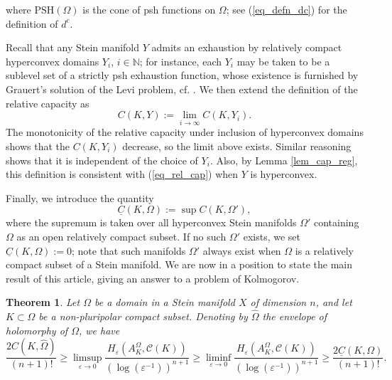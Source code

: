 \documentclass[12pt]{article}
\numberwithin{equation}{section}
\theoremstyle{theorem}
\newtheorem{thm}{Theorem}[section]
\theoremstyle{definition}
\theoremstyle{remark}
\newcommand{\nat}{\mathbb{N}}
\begin{document}
	where $\mathrm{PSH}(\Omega)$ is the cone of psh functions on $\Omega$; see (\ref{eq_defn_dc}) for the definition of $d^c$.
	\par 
	Recall that any Stein manifold $Y$ admits an exhaustion by relatively compact hyperconvex domains $Y_i$, $i \in \nat$; for instance, each $Y_i$ may be taken to be a sublevel set of a strictly psh exhaustion function, whose existence is furnished by Grauert's solution of the Levi problem, cf. \cite[Theorem 5.2.10]{Hormander}.
	We then extend the definition of the relative capacity as
	\begin{equation}\label{eq_rel_cap_gen_dd}
		C(K, Y)
		:=
		\lim_{i \to \infty} C(K, Y_i).
	\end{equation}
	The monotonicity of the relative capacity under inclusion of hyperconvex domains shows that the $C(K, Y_i)$ decrease, so the limit above exists.
	Similar reasoning shows that it is independent of the choice of $Y_i$. 
	Also, by Lemma \ref{lem_cap_reg}, this definition is consistent with (\ref{eq_rel_cap}) when $Y$ is hyperconvex.
	\par 
	Finally, we introduce the quantity
	\begin{equation}\label{eq_und_c}
		\underline{C}(K, \Omega)
		:=
		\sup C(K, \Omega'),
	\end{equation}
	where the supremum is taken over all hyperconvex Stein manifolds $\Omega'$ containing $\Omega$ as an open relatively compact subset.
	If no such $\Omega'$ exists, we set $\underline{C}(K, \Omega) := 0$; note that such manifolds $\Omega'$ always exist when $\Omega$ is a relatively compact subset of a Stein manifold.
	We are now in a position to state the main result of this article, giving an answer to a problem of Kolmogorov.
	\begin{thm}\label{thm_entr}
		Let $\Omega$ be a domain in a Stein manifold $X$ of dimension $n$, and let $K \subset \Omega$ be a non-pluripolar compact subset. Denoting by $\widehat{\Omega}$ the envelope of holomorphy of $\Omega$, we have
		\begin{equation}\label{eq_thm_entr}
			\frac{2 C(K, \widehat{\Omega})}{(n + 1)!}
			\geq
			\limsup_{\varepsilon \to 0}
			\frac{H_{\varepsilon}(A_K^{\Omega}, \mathscr{C}(K))}{(\log(\varepsilon^{-1}))^{n + 1}}
			\geq
			\liminf_{\varepsilon \to 0}
			\frac{H_{\varepsilon}(A_K^{\Omega}, \mathscr{C}(K))}{(\log(\varepsilon^{-1}))^{n + 1}}
			\geq
			\frac{2 \underline{C}(K, \Omega)}{(n + 1)!}.
		\end{equation}
	\end{thm}
\end{document}
